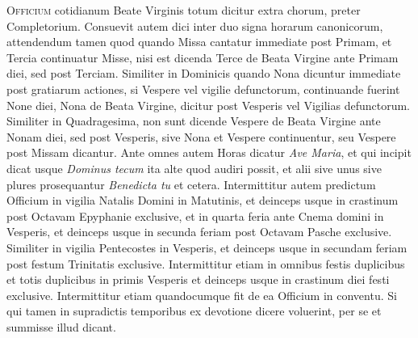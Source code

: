 \documentclass[11pt,openany]{book}
\newcommand*\zallmancaps{\usefont{U}{Zallman}{xl}{n}}
\newcommand{\ubsubsection}[2]{%
	\subsection*{#1}%
	\phantomsection%
	\addcontentsline{toc}{subsection}{#1}%
	\hypertarget{#2}{}%
}
\begin{document}
\begin{multicols*}{2}

\lettrine[lines=2]{\zallmancaps \color{Red} O}{fficium} cotidianum Beate Virginis totum dicitur extra chorum, preter Completorium. Consuevit autem dici inter duo signa horarum canonicorum, attendendum tamen quod quando Missa cantatur immediate post Primam, et Tercia continuatur Misse, nisi est dicenda Terce de Beata Virgine ante Primam diei, sed post Terciam. Similiter in Dominicis quando Nona dicuntur immediate post gratiarum actiones, si Vespere vel vigilie defunctorum, continuande fuerint None diei, Nona de Beata Virgine, dicitur post Vesperis vel Vigilias defunctorum. Similiter in Quadragesima, non sunt dicende Vespere de Beata Virgine ante Nonam diei, sed post Vesperis, sive Nona et Vespere continuentur, seu Vespere post Missam dicantur.
Ante omnes autem Horas dicatur \textit{Ave Maria}, et qui incipit dicat usque \textit{Dominus tecum} ita alte quod audiri possit, et alii sive unus sive plures prosequantur \textit{Benedicta tu} et cetera.
Intermittitur autem predictum Officium in vigilia Natalis Domini in Matutinis, et deinceps usque in crastinum post Octavam Epyphanie exclusive, et in quarta feria ante Cnema domini in Vesperis, et deinceps usque in secunda feriam post Octavam Pasche exclusive. Similiter in vigilia Pentecostes in Vesperis, et deinceps usque in secundam feriam post festum Trinitatis exclusive.
Intermittitur etiam in omnibus festis duplicibus et totis duplicibus in primis Vesperis et deinceps usque in crastinum diei festi exclusive. Intermittitur etiam quandocumque fit de ea Officium in conventu. Si qui tamen in supradictis temporibus ex devotione dicere voluerint, per se et summisse illud dicant.


\end{multicols*}
\end{document}
